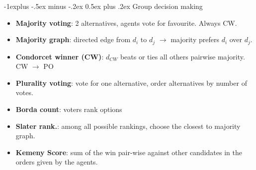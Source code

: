 \documentclass[10pt,a4paper,landscape]{article}
\makeatletter
\renewcommand{\subsection}{\@startsection{subsection}{2}{0mm}%
                                {-1explus -.5ex minus -.2ex}%
                                {0.5ex plus .2ex}%
                                {\normalfont\tiny\bfseries}}
\makeatother
\begin{document}
\begin{multicols*}{5}
\subsection{Group decision making}
\begin{itemize}
	\item \textbf{Majority voting}: 2 alternatives, agents vote for favourite. Always CW.
	\item \textbf{Majority graph}: directed edge from $d_i$ to $d_j$ $\rightarrow$ majority prefers $d_i$ over $d_j$.
	\item \textbf{Condorcet winner (CW)}: $d_{CW}$ beats or ties all others pairwise majority. CW $\rightarrow$ PO
	\item \textbf{Plurality voting}: vote for one alternative, order
	alternatives by number of votes.
	\item \textbf{Borda count}: voters rank options 
	\item \textbf{Slater rank.}: among all possible rankings, choose the closest to majority graph.
	\item \textbf{Kemeny Score}: sum of the win pair-wise against other candidates in the orders given by the agents.
\end{itemize}



\end{multicols*}
\end{document}
